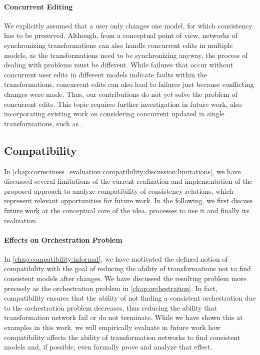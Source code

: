 \paragraph{Concurrent Editing}
\label{chap:futurework:correctness:concurrent}
We explicitly assumed that a user only changes one model, for which consistency has to be preserved.
Although, from a conceptual point of view, networks of synchronizing transformations can also handle concurrent edits in multiple models, as the transformations need to be synchronizing anyway, the process of dealing with problems must be different.
While failures that occur without concurrent user edits in different models indicate faults within the transformations, concurrent edits can also lead to failures just because conflicting changes were made.
Thus, our contributions do not yet solve the problem of concurrent edits.
This topic requires further investigation in future work, also incorporating existing work on considering concurrent updated in single transformations, such as \cite{xiong2013SynchronizingConcurrentUpdates-SoSym,xiong2009parallelUpdates-ICMT}.


\subsection{Compatibility}

In \autoref{chap:correctness_evaluation:compatibility:discussion:limitations}, we have discussed several limitations of the current realization and implementation of the proposed approach to analyze compatibility of consistency relations, which represent relevant opportunities for future work.
In the following, we first discuss future work at the conceptual core of the idea, processes to use it and finally its realization.

\paragraph{Effects on Orchestration Problem}
\label{chap:futurework:correctness:compatibility:orchestration}
In \autoref{chap:compatibility:informal}, we have motivated the defined notion of compatibility with the goal of reducing the ability of transformations not to find consistent models after changes.
We have discussed the resulting problem more precisely as the orchestration problem in \autoref{chap:orchestration}.
In fact, compatibility ensures that the ability of not finding a consistent orchestration due to the orchestration problem decreases, thus reducing the ability that transformation network fail or do not terminate.
While we have shown this at examples in this work, we will empirically evaluate in future work how compatibility affects the ability of transformation networks to find consistent models and, if possible, even formally prove and analyze that effect. 

